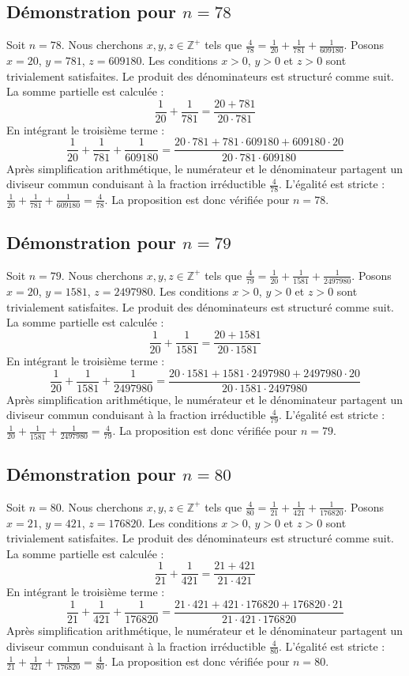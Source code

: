 \documentclass[11pt,a4paper]{article}
\begin{document}
\subsection{Démonstration pour $n = 78$}
Soit $n = 78$. Nous cherchons $x, y, z \in \mathbb{Z}^{+}$ tels que $\frac{4}{78} = \frac{1}{20} + \frac{1}{781} + \frac{1}{609180}$.
Posons $x = 20$, $y = 781$, $z = 609180$.
Les conditions $x > 0$, $y > 0$ et $z > 0$ sont trivialement satisfaites.
Le produit des dénominateurs est structuré comme suit. La somme partielle est calculée :
$$ \frac{1}{20} + \frac{1}{781} = \frac{20+781}{20 \cdot 781} $$
En intégrant le troisième terme :
$$ \frac{1}{20} + \frac{1}{781} + \frac{1}{609180} = \frac{20 \cdot 781 + 781 \cdot 609180 + 609180 \cdot 20}{20 \cdot 781 \cdot 609180} $$
Après simplification arithmétique, le numérateur et le dénominateur partagent un diviseur commun conduisant à la fraction irréductible $\frac{4}{78}$.
L'égalité est stricte : $\frac{1}{20} + \frac{1}{781} + \frac{1}{609180} = \frac{4}{78}$.
La proposition est donc vérifiée pour $n = 78$.
\subsection{Démonstration pour $n = 79$}
Soit $n = 79$. Nous cherchons $x, y, z \in \mathbb{Z}^{+}$ tels que $\frac{4}{79} = \frac{1}{20} + \frac{1}{1581} + \frac{1}{2497980}$.
Posons $x = 20$, $y = 1581$, $z = 2497980$.
Les conditions $x > 0$, $y > 0$ et $z > 0$ sont trivialement satisfaites.
Le produit des dénominateurs est structuré comme suit. La somme partielle est calculée :
$$ \frac{1}{20} + \frac{1}{1581} = \frac{20+1581}{20 \cdot 1581} $$
En intégrant le troisième terme :
$$ \frac{1}{20} + \frac{1}{1581} + \frac{1}{2497980} = \frac{20 \cdot 1581 + 1581 \cdot 2497980 + 2497980 \cdot 20}{20 \cdot 1581 \cdot 2497980} $$
Après simplification arithmétique, le numérateur et le dénominateur partagent un diviseur commun conduisant à la fraction irréductible $\frac{4}{79}$.
L'égalité est stricte : $\frac{1}{20} + \frac{1}{1581} + \frac{1}{2497980} = \frac{4}{79}$.
La proposition est donc vérifiée pour $n = 79$.
\subsection{Démonstration pour $n = 80$}
Soit $n = 80$. Nous cherchons $x, y, z \in \mathbb{Z}^{+}$ tels que $\frac{4}{80} = \frac{1}{21} + \frac{1}{421} + \frac{1}{176820}$.
Posons $x = 21$, $y = 421$, $z = 176820$.
Les conditions $x > 0$, $y > 0$ et $z > 0$ sont trivialement satisfaites.
Le produit des dénominateurs est structuré comme suit. La somme partielle est calculée :
$$ \frac{1}{21} + \frac{1}{421} = \frac{21+421}{21 \cdot 421} $$
En intégrant le troisième terme :
$$ \frac{1}{21} + \frac{1}{421} + \frac{1}{176820} = \frac{21 \cdot 421 + 421 \cdot 176820 + 176820 \cdot 21}{21 \cdot 421 \cdot 176820} $$
Après simplification arithmétique, le numérateur et le dénominateur partagent un diviseur commun conduisant à la fraction irréductible $\frac{4}{80}$.
L'égalité est stricte : $\frac{1}{21} + \frac{1}{421} + \frac{1}{176820} = \frac{4}{80}$.
La proposition est donc vérifiée pour $n = 80$.
\end{document}
